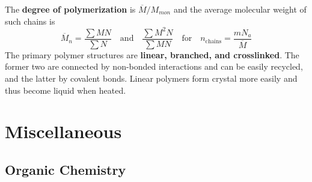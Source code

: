 \documentclass{tufte-book}
\renewcommand{\emph}[1]{\textbf{#1}}
\begin{document}
\bigskip
The \emph{degree of polymerization} is $\overline M / M_{mon}$ and the average molecular weight of such chains is
\begin{equation}
  \overline M_n = \frac{\sum MN}{\sum N} \quad\text{and}\quad \frac{\sum M^2 N}{\sum MN} \quad\text{for}\quad n_{\mathrm{chains}} = \frac{m N_a}{\overline M}
\end{equation}
The primary polymer structures are \emph{linear, branched, and crosslinked}. The former two are connected by non-bonded interactions and can be easily recycled, and the latter by covalent bonds. Linear polymers form crystal more easily and thus become liquid when heated.


\chapter{Miscellaneous}

\section{Organic Chemistry}
\end{document}

